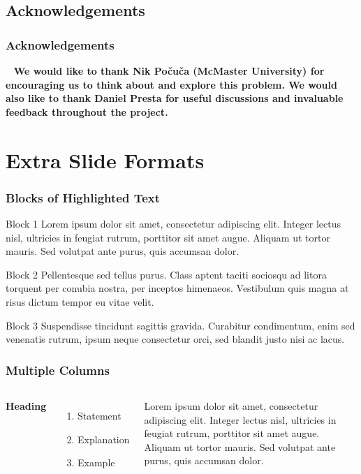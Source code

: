 \documentclass{beamer}
\begin{document}
\begin{frame}
\section{Acknowledgements}
\frametitle{Acknowledgements}
\large
\begin{block}{~}
\textbf{We would like to thank Nik Počuča (McMaster University) for encouraging us to think about and explore this problem. We would also like to thank Daniel Presta for useful discussions and invaluable feedback throughout the project.}
\end{block}
\normalsize
\end{frame}




\iffalse %
\section{Extra Slide Formats} %
\begin{frame}
\frametitle{Blocks of Highlighted Text}
\begin{block}{Block 1}
Lorem ipsum dolor sit amet, consectetur adipiscing elit. Integer lectus nisl, ultricies in feugiat rutrum, porttitor sit amet augue. Aliquam ut tortor mauris. Sed volutpat ante purus, quis accumsan dolor.
\end{block}

\begin{block}{Block 2}
Pellentesque sed tellus purus. Class aptent taciti sociosqu ad litora torquent per conubia nostra, per inceptos himenaeos. Vestibulum quis magna at risus dictum tempor eu vitae velit.
\end{block}

\begin{block}{Block 3}
Suspendisse tincidunt sagittis gravida. Curabitur condimentum, enim sed venenatis rutrum, ipsum neque consectetur orci, sed blandit justo nisi ac lacus.
\end{block}
\end{frame}

\begin{frame}
\frametitle{Multiple Columns}
\begin{columns}[c] %
\textbf{Heading}
\begin{enumerate}
\item Statement
\item Explanation
\item Example
\end{enumerate}

Lorem ipsum dolor sit amet, consectetur adipiscing elit. Integer lectus nisl, ultricies in feugiat rutrum, porttitor sit amet augue. Aliquam ut tortor mauris. Sed volutpat ante purus, quis accumsan dolor.
\end{columns}
\end{frame}
\end{document}
